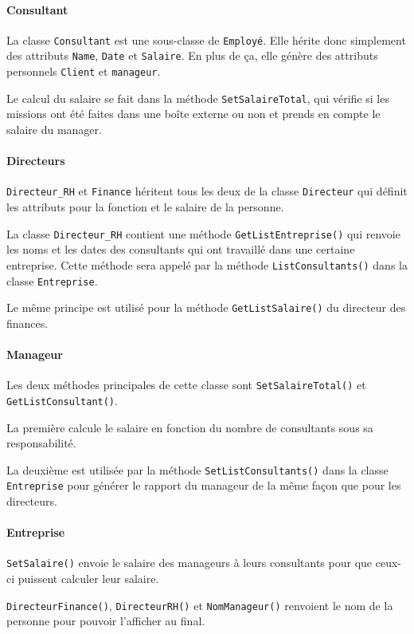 \documentclass[a4paper, 11pt]{article}
\begin{document}
\paragraph{Consultant}
La classe \texttt{Consultant} est une sous-classe de \texttt{Employé}. Elle hérite donc simplement des attributs \texttt{Name}, \texttt{Date} et \texttt{Salaire}. En plus de ça, elle génère des attributs personnels \texttt{Client} et \texttt{manageur}.

Le calcul du salaire se fait dans la méthode \texttt{SetSalaireTotal}, qui vérifie si les missions ont été faites dans une boîte externe ou non et prends en compte le salaire du manager.

\paragraph{Directeurs}
\verb|Directeur_RH| et \texttt{Finance} héritent tous les deux de la classe \texttt{Directeur} qui définit les attributs pour la fonction et le salaire de la personne.

La classe \verb|Directeur_RH| contient une méthode \texttt{GetListEntreprise()} qui renvoie les noms et les dates des consultants qui ont travaillé dans une certaine entreprise. Cette méthode sera appelé par la méthode \texttt{ListConsultants()} dans la classe \texttt{Entreprise}.

Le même principe est utilisé pour la méthode \texttt{GetListSalaire()} du directeur des finances.

\paragraph{Manageur}
Les deux méthodes principales de cette classe sont \texttt{SetSalaireTotal()} et \texttt{GetListConsultant()}.

La première calcule le salaire en fonction du nombre de consultants sous sa responsabilité.

La deuxième est utilisée par la méthode \texttt{SetListConsultants()} dans la classe \texttt{Entreprise} pour générer le rapport du manageur de la même façon que pour les directeurs.

\paragraph{Entreprise}
\texttt{SetSalaire()} envoie le salaire des manageurs à leurs consultants pour que ceux-ci puissent calculer leur salaire.

\texttt{DirecteurFinance()}, \texttt{DirecteurRH()} et \texttt{NomManageur()} renvoient le nom de la personne pour pouvoir l'afficher au final.
\end{document}
